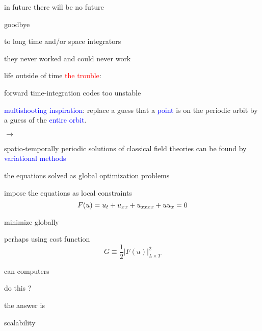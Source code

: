 \begin{frame}{in future there will be no future}
\begin{center}
{\huge goodbye}
\end{center}

\vfill

to long time and/or space integrators

\medskip

\hfill they never worked and could never work
\end{frame}

\begin{frame}{life outside of time}
\textcolor{red}{the trouble}:

forward time-integration codes too unstable

\bigskip
\bigskip

\textcolor{blue}{multishooting inspiration}:
 replace a guess that a  \textcolor{blue}{point} is on the periodic
orbit by a guess of the \textcolor{blue}{entire orbit}.

\bigskip

$\to$

\bigskip

spatio-temporally periodic solutions of classical field theories
can be found by \textcolor{blue}{variational methods}
\end{frame}

\begin{frame}{the equations solved as global optimization problems}
\begin{block}{impose the equations as local constraints}
\[
F(u) = u_t + u_{x x} + u_{x x x x} + u u_{x} = 0
\]
\end{block}
\bigskip\bigskip
minimize globally
\begin{block}{perhaps using cost function}
\[
G \equiv \frac{1}{2} |F(u)|^2_{L \times T}
\]
\end{block}
\end{frame}

\begin{frame}{can computers}

\vfill

{\Huge do this ?             }

\vfill
\end{frame}

\begin{frame}{the answer is}

\vfill

{\Huge
scalability
                  }

\vfill

\end{frame}

